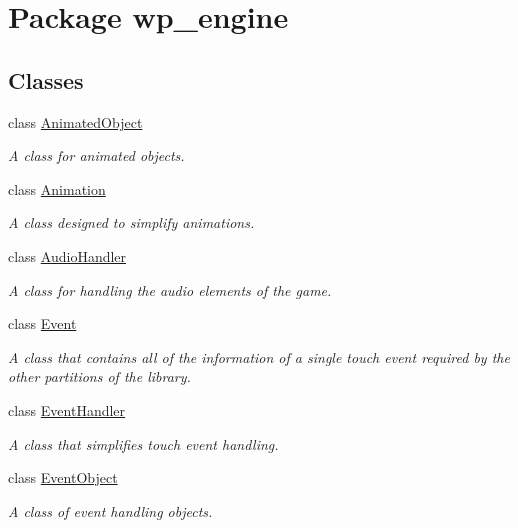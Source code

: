 \hypertarget{namespacewp__engine}{\section{Package wp\-\_\-engine}
\label{namespacewp__engine}
}
\subsection*{Classes}
\begin{DoxyCompactItemize}
\item 
class \hyperlink{classwp__engine_1_1_animated_object}{Animated\-Object}
\begin{DoxyCompactList}\small\item\em A class for animated objects. \end{DoxyCompactList}\item 
class \hyperlink{classwp__engine_1_1_animation}{Animation}
\begin{DoxyCompactList}\small\item\em A class designed to simplify animations. \end{DoxyCompactList}\item 
class \hyperlink{classwp__engine_1_1_audio_handler}{Audio\-Handler}
\begin{DoxyCompactList}\small\item\em A class for handling the audio elements of the game. \end{DoxyCompactList}\item 
class \hyperlink{classwp__engine_1_1_event}{Event}
\begin{DoxyCompactList}\small\item\em A class that contains all of the information of a single touch event required by the other partitions of the library. \end{DoxyCompactList}\item 
class \hyperlink{classwp__engine_1_1_event_handler}{Event\-Handler}
\begin{DoxyCompactList}\small\item\em A class that simplifies touch event handling. \end{DoxyCompactList}\item 
class \hyperlink{classwp__engine_1_1_event_object}{Event\-Object}
\begin{DoxyCompactList}\small\item\em A class of event handling objects. \end{DoxyCompactList}\item 

\end{DoxyCompactItemize}
